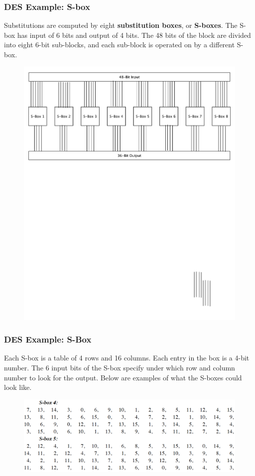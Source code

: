 \documentclass{beamer}
\newcommand{\<}{\langle}
\renewcommand{\>}{\rangle}
\begin{document}
\begin{frame}
\frametitle{DES Example: S-box}

Substitutions are computed by eight \textbf{substitution boxes}, or \textbf{S-boxes}. The S-box has input of 6 bits and output of 4 bits. The 48 bits of the block are divided into eight 6-bit sub-blocks, and each sub-block is operated on by a different S-box. 

\begin{figure}
\includegraphics[scale=.45]{IMG/sbox}
\end{figure}
\end{frame}


\begin{frame}
\frametitle{DES Example: S-Box}

Each S-box is a table of 4 rows and 16 columns. Each entry in the box is a 4-bit number. The 6 input bits of the S-box specify under which row and column number to look for the output. Below are examples of what the S-boxes could look like. 

\begin{figure}
\includegraphics[scale=.5]{IMG/sbox2}
\end{figure}
\end{frame}
\end{document}
